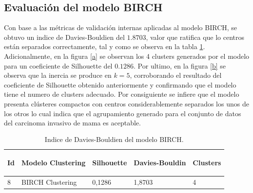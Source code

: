 \subsection{Evaluación del modelo BIRCH}
Con base a las métricas de validación internas aplicadas al modelo BIRCH, se obtuvo un indice de Davies-Bouldien del $1.8703$, valor que ratifica que lo centros están separados correctamente, tal y como se observa en la tabla \ref{Davies-Bouldien}. Adicionalmente, en la figura \ref{a} se observan los 4 clusters generados por el modelo para un coeficiente de Silhouette del $0.1286$. Por ultimo, en la figura \ref{b} se observa que la inercia se produce en $k = 5 $, corroborando el resultado del coeficiente de Silhouette obtenido anteriormente y confirmando que el modelo tiene el numero de clusters adecuado. Por consiguiente se infiere que el modelo presenta clústeres compactos con centros considerablemente separados los unos de los otros lo cual indica que el agrupamiento generado para el conjunto de datos del carcinoma invasivo de mama es aceptable. 

\begin{table}[!htb]
	\footnotesize
	\centering
	\begin{threeparttable}
		\begin{tabular}{p{1cm} p{4cm} p{2.5cm} p{2.5cm} p{1.5cm}} \toprule	
			\begin{center}Id\end{center}
			&\begin{center}Modelo Clustering\end{center}
			&\begin{center}Silhouette\end{center}
			&\begin{center}Davies-Bouldin\end{center}
			&\begin{center}Clusters\end{center}
			\\ \hline 8 & BIRCH Clustering	&	0,1286	&	1,8703	&	4
			\\ \hline
		\end{tabular}
		\caption{Indice de Davies-Bouldien del modelo BIRCH.}
		\label{Davies-Bouldien}
	\end{threeparttable}
\end{table}

